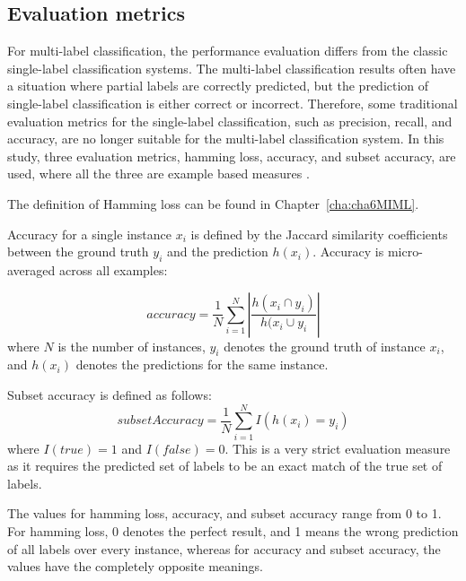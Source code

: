 \subsection{Evaluation metrics}
For multi-label classification, the performance evaluation differs from the classic single-label classification systems. The multi-label classification results often have a situation where partial labels are correctly predicted, but the prediction of single-label classification is either correct or incorrect. Therefore, some traditional evaluation metrics for the single-label classification, such as precision, recall, and accuracy, are no longer suitable for the multi-label classification system. In this study, three evaluation metrics, hamming loss, accuracy, and subset accuracy, are used, where all the three are example based measures \citep{madjarov2012extensive}.


The definition of Hamming loss can be found in Chapter~\ref{cha:cha6MIML}.

Accuracy for a single instance $x_{i}$ is defined by the Jaccard similarity coefficients between the ground truth $y_{i}$ and the prediction $h(x_{i})$. Accuracy is micro-averaged across all examples:

\begin{equation}
accuracy = \frac{1}{N}\sum_{i=1}^{N}|\frac{h(x_{i} \cap y_{i})}{h(x_{i} \cup y_{i}}|
\end{equation}
where $N$ is the number of instances, $y_{i}$ denotes the ground truth of instance $x_{i}$, and $h(x_{i})$ denotes the predictions for the same instance. 


Subset accuracy is defined as follows:
\begin{equation}
subsetAccuracy = \frac{1}{N}\sum_{i=1}^{N}I(h(x_{i})=y_{i})
\end{equation}
where $I(true)=1$ and $I(false)=0$. This is a very strict evaluation
measure as it requires the predicted set of labels to be an exact
match of the true set of labels.


The values for hamming loss, accuracy, and subset accuracy range from 0 to 1. For hamming loss, 0 denotes the perfect result, and 1 means the wrong prediction of all labels over every instance, whereas for accuracy and subset accuracy, the values have the completely opposite meanings.



